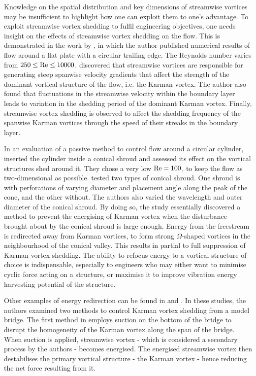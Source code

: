 \documentclass[oneside]{utmthesis}
\begin{document}
Knowledge on the spatial distribution and key dimensions of streamwise vortices may be insufficient to highlight how one can exploit them to one's advantage. To exploit streamwise vortex shedding to fulfil engineering objectives, one needs insight on the effects of streamwise vortex shedding on the flow. This is demonstrated in the work by \citet{Rai2018}, in which the author published numerical results of flow around a flat plate with a circular trailing edge. The Reynolds number varies from $250 \leq \text{Re} \leq 10000$. \citet{Rai2018} discovered that streamwise vortices are responsible for generating steep spanwise velocity gradients that affect the strength of the dominant vortical structure of the flow, i.e. the Karman vortex. The author also found that fluctuations in the streamwise velocity within the boundary layer leads to variation in the shedding period of the dominant Karman vortex. Finally, streamwise vortex shedding is observed to affect the shedding frequency of the spanwise Karman vortices through the speed of their streaks in the boundary layer.

In an evaluation of a passive method to control flow around a circular cylinder, \citet{Lin2018} inserted the cylinder inside a conical shroud and assessed its effect on the vortical structures shed around it. They chose a very low $\text{Re} = 100$, to keep the flow as two-dimensional as possible. \citet{Lin2018} tested two types of conical shroud. One shroud is with perforations of varying diameter and placement angle along the peak of the cone, and the other without. The authors also varied the wavelength and outer diameter of the conical shroud. By doing so, the study essentially discovered a method to prevent the energising of Karman vortex when the disturbance brought about by the conical shroud is large enough. Energy from the freestream is redirected away from Karman vortices, to form strong $\Omega$-shaped vortices in the neighbourhood of the conical valley. This results in partial to full suppression of Karman vortex shedding. The ability to refocus energy to a vortical structure of choice is indispensable, especially to engineers who may either want to minimise cyclic force acting on a structure, or maximise it to improve vibration energy harvesting potential of the structure.

Other examples of energy redirection can be found in \citet{Zhang2016} and \citet{Zhang2019}. In these studies, the authors examined two methods to control Karman vortex shedding from a model bridge. The first method in \citet{Zhang2016} employs suction on the bottom of the bridge to disrupt the homogeneity of the Karman vortex along the span of the bridge. When suction is applied, streamwise vortex - which is considered a secondary process by the authors - becomes energised. The energised streamwise vortex then destabilises the primary vortical structure - the Karman vortex - hence reducing the net force resulting from it.
\end{document}

